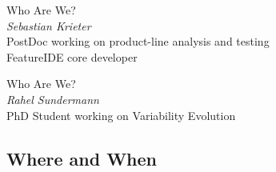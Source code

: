 \begin{frame}{\myframetitle}
	\begin{fancycolumns}[animation=none]
			\begin{note}{Who Are We?}
			    \centering
			    \\[.5ex]
				\emph{Sebastian Krieter}\\[.5ex]
				\small PostDoc working on product-line analysis and testing\\[.5ex]
				FeatureIDE core developer
			\end{note}
				\nextcolumn
		\begin{note}{Who Are We?}
			\centering
			\\[.5ex]
			\emph{Rahel Sundermann}\\[.5ex]
			\small PhD Student working on Variability Evolution\\[.5ex]
			\phantom {Fp}
		\end{note}
	\end{fancycolumns}
\end{frame}

\subsection{Where and When}

